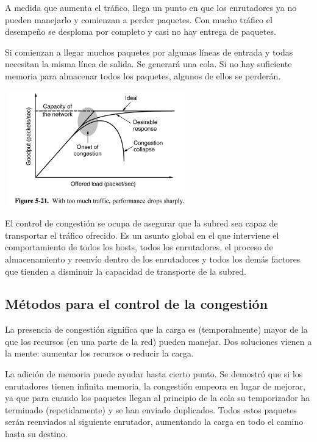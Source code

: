\documentclass[10pt,a4paper]{report}
\begin{document}
	\par A medida que aumenta el tráfico, llega un punto en que los enrutadores ya no pueden manejarlo y comienzan a perder paquetes. Con mucho tráfico el desempeño se desploma por completo y casi no hay entrega de paquetes.

	\par Si comienzan a llegar muchos paquetes por algunas líneas de entrada y todas necesitan la misma línea de salida. Se generará una cola. Si no hay suficiente memoria para almacenar todos los paquetes, algunos de ellos se perderán.
	
	\begin{center}
			\includegraphics[width=8cm, height=5cm]{./imagenes/congestion.png} 
	\end{center}

	\par El control de congestión se ocupa de asegurar que la subred sea capaz de transportar el tráfico ofrecido. Es un asunto global en el que interviene el comportamiento de todos los hosts, todos los enrutadores, el proceso de almacenamiento y reenvío dentro de los enrutadores y todos los demás factores que tienden a disminuir la capacidad de transporte de la subred.

\subsection{Métodos para el control de la congestión}

	\par La presencia de congestión significa que la carga es (temporalmente) mayor de la que los recursos (en una parte de la red) pueden manejar. Dos soluciones vienen a la mente: aumentar los recursos o reducir la carga.
	
	\par La adición de memoria puede ayudar hasta cierto punto. Se demostró que si los enrutadores tienen infinita memoria, la congestión empeora en lugar de mejorar, ya que para cuando los paquetes llegan al principio de la cola su temporizador ha terminado (repetidamente) y se han enviado duplicados. Todos estos paquetes serán reenviados al siguiente enrutador, aumentando la carga en todo el camino hasta su destino.
\end{document}
